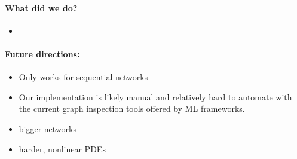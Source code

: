 
\paragraph{What did we do?}

\begin{itemize}
    \item 
\end{itemize}

\paragraph{Future directions:}
\begin{itemize}
    \item Only works for sequential networks
    \item Our implementation is likely manual and relatively hard to automate with the current graph inspection tools offered by ML frameworks.
    \item bigger networks
    \item harder, nonlinear PDEs 
\end{itemize}



